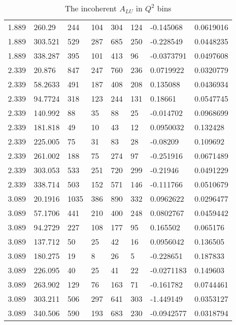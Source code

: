 \documentclass[12pt]{article}
\begin{document}
\begin{table}[!h]
\begin{center}
\begin{tabular}{||l|l|l|l|l|l|l|l||}
1.889    &260.29     &244    &104   &304   &124    &-0.145068    &0.0619016\\
1.889    &303.521     &529    &287   &685   &250    &-0.228549    &0.0448235\\
1.889    &338.287     &395    &101   &413   &96    &-0.0373791    &0.0497608\\
\hline
2.339    &20.876     &847    &247   &760   &236    &0.0719922    &0.0320779\\
2.339    &58.2633     &491    &187   &408   &208    &0.135088    &0.0436934\\
2.339    &94.7724     &318    &123   &244   &131    &0.18661    &0.0547745\\
2.339    &140.992     &88    &35   &88   &25    &-0.014702    &0.0968699\\
2.339    &181.818     &49    &10   &43   &12    &0.0950032    &0.132428\\
2.339    &225.005     &75    &31   &83   &28    &-0.08209    &0.109692\\
2.339    &261.002     &188    &75   &274   &97    &-0.251916    &0.0671489\\
2.339    &303.053     &533    &251   &720   &299    &-0.21946    &0.0491229\\
2.339    &338.714     &503    &152   &571   &146    &-0.111766    &0.0510679\\
\hline
3.089    &20.1916     &1035    &386   &890   &332    &0.0962622    &0.0296477\\
3.089    &57.1706     &441    &210   &400   &248    &0.0802767    &0.0459442\\
3.089    &94.2729     &227    &108   &177   &95    &0.165502    &0.065176\\
3.089    &137.712     &50    &25   &42   &16    &0.0956042    &0.136505\\
3.089    &180.275     &19    &8   &26   &5    &-0.228651    &0.187833\\
3.089    &226.095     &40    &25   &41   &22    &-0.0271183    &0.149603\\
3.089    &263.902     &129    &76   &163   &71    &-0.161782    &0.0744461\\
3.089    &303.211      &506    &297   &641   &303    &-1.449149    &0.0353127\\
3.089    &340.506      &590    &193   &683   &230    &-0.0942577    &0.0318794\\   
         
         
         \hline
 \hline
      \end{tabular}
      \caption{The incoherent $A_{LU}$ in $Q^2$ bins}
      \label{table:InCoh_Q2_BSA}
   \end{center}
\end{table}
\end{document}

